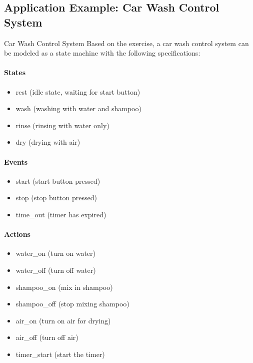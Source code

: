 \subsection{Application Example: Car Wash Control System}

\begin{example2}{Car Wash Control System}
Based on the exercise, a car wash control system can be modeled as a state machine with the following specifications:

\paragraph{States}
\begin{itemize}
    \item rest (idle state, waiting for start button)
    \item wash (washing with water and shampoo)
    \item rinse (rinsing with water only)
    \item dry (drying with air)
\end{itemize}

\paragraph{Events}
\begin{itemize}
    \item start (start button pressed)
    \item stop (stop button pressed)
    \item time\_out (timer has expired)
\end{itemize}

\paragraph{Actions}
\begin{itemize}
    \item water\_on (turn on water)
    \item water\_off (turn off water)
    \item shampoo\_on (mix in shampoo)
    \item shampoo\_off (stop mixing shampoo)
    \item air\_on (turn on air for drying)
    \item air\_off (turn off air)
    \item timer\_start (start the timer)
\end{itemize}


\end{example2}
